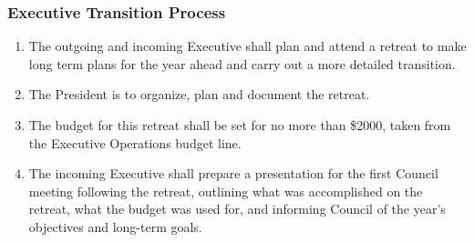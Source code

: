 \subsubsection{Executive Transition Process}
\label{executive-transition-process}
\begin{enumerate}
 \item
  The outgoing and incoming Executive shall plan and attend a retreat to make long term plans for the year ahead and carry out a more detailed transition.
  \item
  The President is to organize, plan and document the retreat.
 \item
  The budget for this retreat shall be set for no more than \$2000, taken from the Executive Operations budget line.
 \item
  The incoming Executive shall prepare a presentation for the first Council meeting following the retreat, outlining what was accomplished on the retreat, what the budget was used for, and informing Council of the year's objectives and long-term goals.
\end{enumerate}

